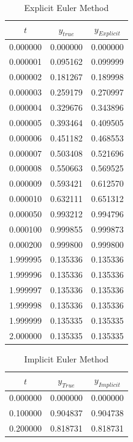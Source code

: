 \documentclass[titlepage, 11pt]{article}
\begin{document}
\begin{itemize}
    \begin{table}[!htb]
    \caption{Explicit Euler Method}
    \centering
    \begin{tabular}{c|c|c}
    \toprule
    \textbf{$t$}& \textbf{$y_{true}$}& \textbf{$y_{Explicit}$}   \\
    \midrule
         0.000000 & 0.000000 & 0.000000 \\
         0.000001 & 0.095162 & 0.099999\\
         0.000002 & 0.181267 & 0.189998\\
         0.000003 & 0.259179 & 0.270997 \\
         0.000004 & 0.329676 & 0.343896 \\
         0.000005 & 0.393464 & 0.409505\\
         0.000006 & 0.451182 & 0.468553 \\
         0.000007 & 0.503408 & 0.521696 \\
         0.000008 & 0.550663 & 0.569525 \\
         0.000009 & 0.593421 & 0.612570 \\
         0.000010 & 0.632111 & 0.651312 \\
         0.000050 & 0.993212 & 0.994796 \\
         0.000100 & 0.999855 & 0.999873 \\ 
         0.000200 & 0.999800 & 0.999800 \\
         1.999995 & 0.135336 & 0.135336 \\
         1.999996 & 0.135336 & 0.135336 \\
         1.999997 & 0.135336 & 0.135336 \\
         1.999998 & 0.135336 & 0.135336 \\
         1.999999 & 0.135335 & 0.135335 \\
         2.000000 & 0.135335 & 0.135335 \\
    \bottomrule
    \end{tabular}
    \label{tab:tabee}
\end{table}
 \begin{table}[!htb]
    \caption{Implicit Euler Method}
    \centering
    \begin{tabular}{c|c|c}
    \toprule
    \textbf{$t$}& \textbf{$y_{True}$}& \textbf{$y_{Implicit}$}   \\
    \midrule
0.000000 &	0.000000 &	0.000000 \\
0.100000 &	0.904837 &	0.904738 \\
0.200000 &	0.818731 &	0.818731 \\

\end{tabular}
\end{table}
\end{itemize}
\end{document}
